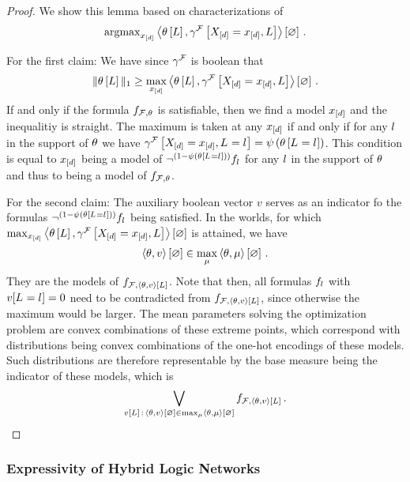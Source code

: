 \begin{proof}
	We show this lemma based on characterizations of
		\[ \mathrm{argmax}_{x_{[d]}} \left\langle \theta\left[L\right],\gamma^{\mathcal{F}}\left[X_{[d]}=x_{[d]},L\right]\right\rangle \left[ \varnothing \right] \, . \]

	For the first claim:
	We have since $\gamma^{\mathcal{F}}$ is boolean that
		\[ \|\theta\left[L\right]\|_1 \geq \max_{x_{[d]}} \left\langle \theta\left[L\right],\gamma^{\mathcal{F}}\left[X_{[d]}=x_{[d]},L\right]\right\rangle \left[ \varnothing \right]  \, . \]
	If and only if the formula $f_{\mathcal{F},\theta}$ is satisfiable, then we find a model $x_{[d]}$ and the inequalitiy is straight.
	The maximum is taken at any $x_{[d]}$ if and only if for any $l$ in the support of $\theta$ we have $\gamma^{\mathcal{F}}\left[X_{[d]}=x_{[d]},L_{}=l_{}\right]=\psi\left(\theta\left[L_{}=l_{}\right]\right)$.
	This condition is equal to $x_{[d]}$ being a model of $\lnot^{(1-\psi\left(\theta\left[L_{}=l_{}\right]\right))} f_{l}$ for any $l$ in the support of $\theta$ and thus to being a model of $f_{\mathcal{F},\theta}$.

	For the second claim:
	The auxiliary boolean vector $v$ serves as an indicator fo the formulas $\lnot^{(1-\psi\left(\theta\left[L_{}=l_{}\right]\right))} f_{l}$ being satisfied.
	In the worlds, for which $\max_{x_{[d]}}\left\langle \theta\left[L\right],\gamma^{\mathcal{F}}\left[X_{[d]}=x_{[d]},L\right]\right\rangle \left[ \varnothing \right]$ is attained, we have 
		\[ \left\langle \theta,v\right\rangle \left[ \varnothing \right] \in \max_{\mu} \left\langle \theta,\mu\right\rangle \left[ \varnothing \right] \, . \]
	They are the models of $f_{\mathcal{F},\left\langle \theta,v\right\rangle \left[ L \right]}$.
	Note that then, all formulas $f_{l}$ with $v[L_{}=l_{}]=0$ need to be contradicted from $f_{\mathcal{F},\left\langle \theta,v\right\rangle \left[ L \right]}$, since otherwise the maximum would be larger.
	The mean parameters solving the optimization problem are convex combinations of these extreme points, which correspond with distributions being convex combinations of the one-hot encodings of these models.
	Such distributions are therefore representable by the base measure being the indicator of these models, which is
		\[ \bigvee_{v[L] \, : \, \left\langle \theta,v\right\rangle \left[ \varnothing \right] \in \max_{\mu} \left\langle \theta,\mu\right\rangle \left[ \varnothing \right] }  f_{\mathcal{F},\left\langle \theta,v\right\rangle \left[ L \right]}  \, . \]
\end{proof}


\subsubsection{Expressivity of Hybrid Logic Networks}

